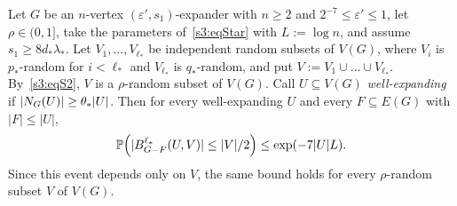 \begin{lemma}\label{s3:lemL17s}
Let $G$ be an $n$-vertex $(\varepsilon',s_1)$-expander with $n\ge2$ and
$2^{-7}\le\varepsilon'\le1$, let $\rho\in(0,1]$, take the parameters
of~\eqref{s3:eqStar} with $L:=\log n$, and assume $s_1\ge 8d_*\lambda_*$.
Let $V_1,\dots,V_{\ell_*}$ be independent random subsets of $V(G)$,
where $V_i$ is $p_*$-random for $i<\ell_*$ and $V_{\ell_*}$ is
$q_*$-random, and put $V:=V_1\cup\dots\cup V_{\ell_*}$. By~\ref{s3:eqS2},
$V$ is a $\rho$-random subset of $V(G)$. Call $U\subseteq V(G)$
\emph{well-expanding} if $|N_G(U)|\ge\theta_*|U|$. Then for every
well-expanding $U$ and every $F\subseteq E(G)$ with $|F|\le|U|$,
\[
\mathbb{P}\Big(|B^{\ell_*}_{G-F}(U,V)|\le|V|/2\Big)\le\exp(-7|U|L).
\]
Since this event depends only on $V$, the same bound holds for every
$\rho$-random subset $V$ of $V(G)$.
\deps{\ref{s3:propP13s}, \ref{s1:citLem17}, \ref{s1:lemBBD}, \ref{s1:citChernoff}, \ref{s1:citChernoffGen}}
\end{lemma}

